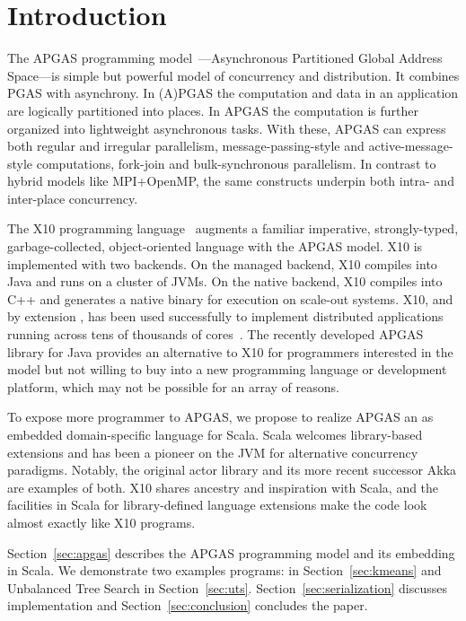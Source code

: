 \section{Introduction}

The APGAS programming model~\cite{amp10}---Asynchronous Partitioned Global Address Space---is simple but powerful
model of concurrency and distribution. It combines PGAS with asynchrony.
In (A)PGAS the computation and data in an application are logically partitioned into places.
In APGAS the computation is further organized into lightweight asynchronous tasks.
With these, APGAS can express both
regular and irregular parallelism, message-passing-style and
active-message-style computations, fork-join and bulk-synchronous
parallelism.  In contrast to hybrid models like MPI+OpenMP, the same
constructs underpin both intra- and inter-place concurrency.

The X10 programming language~\cite{oopsla05} augments a familiar imperative, strongly-typed, garbage-collected, object-oriented language with the APGAS model. X10 is implemented with two backends. On the managed backend, X10
compiles into Java and runs on a cluster of JVMs. On the native backend, X10 compiles into C++ and generates a native binary
for execution on scale-out systems.
X10, and by extension
\apgas, has been used successfully to implement distributed applications
running across tens of thousands of cores~\cite{TardieuETAL14X10ApgasAtPetascale}.
The recently developed APGAS library for Java \cite{APGASJava} provides an alternative to X10 for programmers interested in the \apgas model but not willing to buy into a new programming language or development platform, which may not be possible for an array
of reasons.

To expose more programmer to APGAS, we propose to realize APGAS an as embedded domain-specific language for Scala. 
Scala welcomes library-based extensions and has been a pioneer on
the JVM for alternative concurrency paradigms. Notably, the original actor
library and its more recent successor Akka are examples of both. 
X10 shares ancestry and inspiration with Scala, and the
facilities in Scala for library-defined language extensions make the code look
almost exactly like X10 programs.

Section~\ref{sec:apgas} describes the APGAS programming model and its embedding in Scala. We demonstrate two examples programs: \kmeans in Section~\ref{sec:kmeans} and Unbalanced Tree Search in Section~\ref{sec:uts}. Section~\ref{sec:serialization} discusses implementation and Section~\ref{sec:conclusion} concludes the paper.


